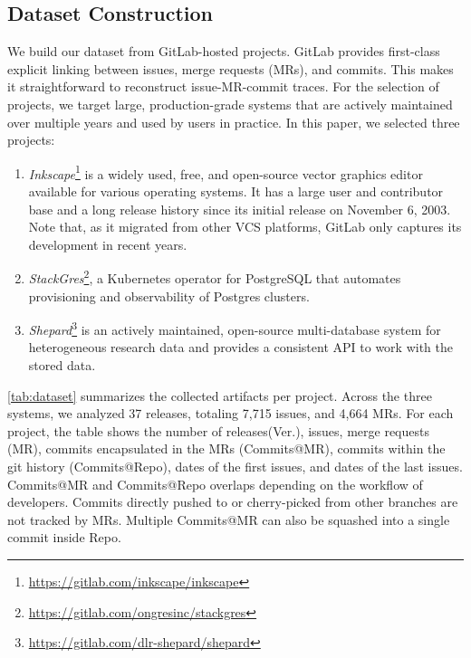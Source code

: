 \subsection{Dataset Construction} 
\label{sec:dataset}
We build our dataset from GitLab-hosted projects.
GitLab provides first-class explicit linking between issues, merge requests (MRs), and commits.
This makes it straightforward to reconstruct issue-MR-commit traces.
For the selection of projects, we target large, production-grade systems that are actively maintained over multiple years and used by users in practice.
In this paper, we selected three projects:
\begin{enumerate}[leftmargin=*]
    \item \textit{Inkscape}\footnote{\url{https://gitlab.com/inkscape/inkscape}} is a widely used, free, and open-source vector graphics editor available for various operating systems.
          It has a large user and contributor base and a long release history since its initial release on November 6, 2003.
          Note that, as it migrated from other VCS platforms, GitLab only captures its development in recent years.
    \item \textit{StackGres}\footnote{\url{https://gitlab.com/ongresinc/stackgres}}, a Kubernetes operator for PostgreSQL that automates provisioning and observability of Postgres clusters.
    \item \textit{Shepard}\footnote{\url{https://gitlab.com/dlr-shepard/shepard}} is an actively maintained, open-source multi-database system for heterogeneous research data and provides a consistent API to work with the stored data.
\end{enumerate}

\autoref{tab:dataset} summarizes the collected artifacts per project.
Across the three systems, we analyzed 37 releases, totaling 7,715 issues, and 4,664 MRs.
For each project, the table shows the number of releases(Ver.), issues, merge requests (MR), commits encapsulated in the MRs (Commits@MR), commits within the git history (Commits@Repo), dates of the first issues, and dates of the last issues.
Commits@MR and Commits@Repo overlaps depending on the workflow of developers.
Commits directly pushed to or cherry-picked from other branches are not tracked by MRs.
Multiple Commits@MR can also be squashed into a single commit inside Repo. 


